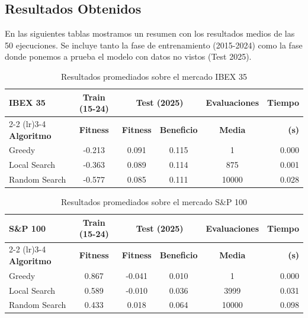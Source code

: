\subsection{Resultados Obtenidos}

En las siguientes tablas mostramos un resumen con los resultados medios de las 50 ejecuciones. Se incluye tanto la fase de entrenamiento (2015-2024) como la fase donde ponemos a prueba el modelo con datos no vistos (Test 2025).

\begin{table}[htbp]
\centering
\begin{tabular}{@{}lccccr@{}}
\toprule
\textbf{IBEX 35} & \textbf{Train (15-24)} & \multicolumn{2}{c}{\textbf{Test (2025)}} & \textbf{Evaluaciones} & \textbf{Tiempo} \\ \cmidrule(lr){2-2} \cmidrule(lr){3-4}
\textbf{Algoritmo} & \textbf{Fitness} & \textbf{Fitness} & \textbf{Beneficio} & \textbf{Media} & \textbf{(s)} \\ \midrule
Greedy & -0.213 & 0.091 & 0.115 & 1 & 0.000 \\
Local Search & -0.363 & 0.089 & 0.114 & 875 & 0.001 \\
Random Search & -0.577 & 0.085 & 0.111 & 10000 & 0.028 \\ \bottomrule
\end{tabular}
\caption{Resultados promediados sobre el mercado IBEX 35}
\label{tab:ibex}
\end{table}

\begin{table}[htbp]
\centering
\begin{tabular}{@{}lccccr@{}}
\toprule
\textbf{S\&P 100} & \textbf{Train (15-24)} & \multicolumn{2}{c}{\textbf{Test (2025)}} & \textbf{Evaluaciones} & \textbf{Tiempo} \\ \cmidrule(lr){2-2} \cmidrule(lr){3-4}
\textbf{Algoritmo} & \textbf{Fitness} & \textbf{Fitness} & \textbf{Beneficio} & \textbf{Media} & \textbf{(s)} \\ \midrule
Greedy & 0.867 & -0.041 & 0.010 & 1 & 0.000 \\
Local Search & 0.589 & -0.010 & 0.036 & 3999 & 0.031 \\
Random Search & 0.433 & 0.018 & 0.064 & 10000 & 0.098 \\ \bottomrule
\end{tabular}
\caption{Resultados promediados sobre el mercado S\&P 100}
\label{tab:sp100}
\end{table}

